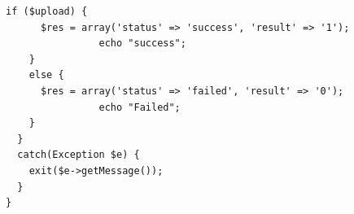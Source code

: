 \begin{lstlisting}[label=cdaws.03-01,style=php,caption=Kode Sumber \textit{Back-end} Upload Gambar Barang]
    if ($upload) {
      $res = array('status' => 'success', 'result' => '1');
                echo "success";
    }
    else {
      $res = array('status' => 'failed', 'result' => '0');
                echo "Failed";
    }
  }
  catch(Exception $e) {
    exit($e->getMessage());
  }
}

\end{lstlisting}